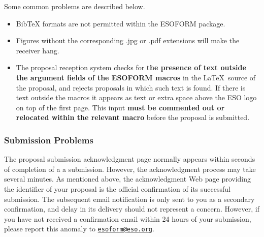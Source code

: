 \documentclass{article}
\begin{document}
Some common problems are described below.
\begin{itemize}
\item BibTeX formats are not permitted within the ESOFORM package.
\item Figures without the corresponding .jpg or .pdf extensions will make the receiver hang.
\item The proposal reception system checks for {\bf the presence of text outside
 the argument fields of the ESOFORM macros} in the \LaTeX\ source of
the proposal, and rejects proposals in which such text is
found. If there is text outside the macros it appears as text or extra space above
the ESO logo on top of the first page.
This input {\bf must be commented out or relocated within the relevant macro} before the proposal is
submitted.

\end{itemize}

\subsubsection*{Submission Problems} 


The proposal submission
acknowledgment page normally appears within seconds of completion of a
a submission. However, the 
acknowledgment process may take several minutes. 
As mentioned above, the acknowledgment Web page providing the
identifier of your proposal is the official confirmation of its
successful submission. The subsequent email notification is only sent
to you as a secondary confirmation, and delay in its delivery should
not represent a concern. However, if you have not received
a confirmation email within 24 hours of your submission, please report this anomaly to  
\href{mailto:esoform@eso.org}{\tt esoform@eso.org}. 

\vspace*{1cm}

\begin{center}
\end{center}
\end{document}

